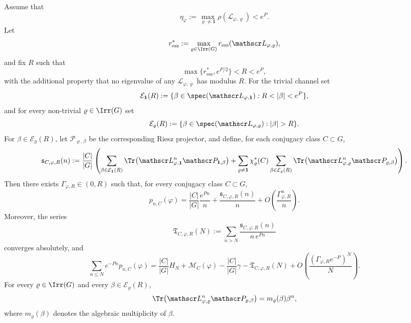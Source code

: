 \begin{theorem}
  \label{thm:holder-transfer-spectral-window}
  Assume that
  \[
    \eta_\varphi
    :=
    \max_{\varrho\neq\mathbf 1}\rho(\mathscr L_{\varphi,\varrho})
    <e^P.
  \]
  Let
  \[
    r_{\mathrm{ess}}^\ast
    :=
    \max_{\varrho\in\Irr(G)}
      r_{\mathrm{ess}}(\mathscr L_{\varphi,\varrho}),
  \]
  and fix \(R\) such that
  \[
    \max\{r_{\mathrm{ess}}^\ast,e^{P/2}\}<R<e^P,
  \]
  with the additional property that no eigenvalue of any
  \(\mathscr L_{\varphi,\varrho}\) has modulus \(R\).
  For the trivial channel set
  \[
    \mathcal E_{\mathbf 1}(R)
    :=
    \{\beta\in\spec(\mathscr L_{\varphi,\mathbf 1}):R<|\beta|<e^P\},
  \]
  and for every non-trivial \(\varrho\in\Irr(G)\) set
  \[
    \mathcal E_\varrho(R)
    :=
    \{\beta\in\spec(\mathscr L_{\varphi,\varrho}):|\beta|>R\}.
  \]
  For \(\beta\in\mathcal E_\varrho(R)\), let
  \(\mathscr P_{\varrho,\beta}\) be the corresponding Riesz projector,
  and define, for each conjugacy class \(C\subset G\),
  \begin{equation}\label{eq:holder-transfer-spectral-window-profile}
    \mathfrak s_{C,\varphi,R}(n)
    :=
    \frac{|C|}{|G|}
    \left(
      \sum_{\beta\in\mathcal E_{\mathbf 1}(R)}
        \Tr\bigl(\mathscr L_{\varphi,\mathbf 1}^n
          \mathscr P_{\mathbf 1,\beta}\bigr)
      +
      \sum_{\varrho\neq\mathbf 1}\chi_\varrho^\ast(C)
        \sum_{\beta\in\mathcal E_\varrho(R)}
          \Tr\bigl(\mathscr L_{\varphi,\varrho}^n
            \mathscr P_{\varrho,\beta}\bigr)
    \right).
  \end{equation}
  Then there exists \(\Gamma_{\varphi,R}\in(0,R)\) such that, for every
  conjugacy class \(C\subset G\),
  \begin{equation}\label{eq:holder-transfer-spectral-window-pointwise}
    p_{n,C}(\varphi)
    =
    \frac{|C|}{|G|}\frac{e^{Pn}}{n}
    +\frac{\mathfrak s_{C,\varphi,R}(n)}{n}
    +O\!\left(\frac{\Gamma_{\varphi,R}^n}{n}\right).
  \end{equation}
  Moreover, the series
  \begin{equation}\label{eq:holder-transfer-spectral-window-tail}
    \mathfrak T_{C,\varphi,R}(N)
    :=
    \sum_{n>N}
      \frac{\mathfrak s_{C,\varphi,R}(n)}{n\,e^{Pn}}
  \end{equation}
  converges absolutely, and
  \begin{equation}\label{eq:holder-transfer-spectral-window-harmonic}
    \sum_{n\le N}e^{-Pn}p_{n,C}(\varphi)
    =
    \frac{|C|}{|G|}H_N
    +\mathcal M_C(\varphi)-\frac{|C|}{|G|}\gamma
    -\mathfrak T_{C,\varphi,R}(N)
    +O\!\left(\frac{(\Gamma_{\varphi,R}e^{-P})^N}{N}\right).
  \end{equation}
  For every \(\varrho\in\Irr(G)\) and every
  \(\beta\in\mathcal E_\varrho(R)\),
  \[
    \Tr\bigl(\mathscr L_{\varphi,\varrho}^n\mathscr P_{\varrho,\beta}\bigr)
    =m_\varrho(\beta)\beta^n,
  \]
  where \(m_\varrho(\beta)\) denotes the algebraic multiplicity of
  \(\beta\).
\end{theorem}

